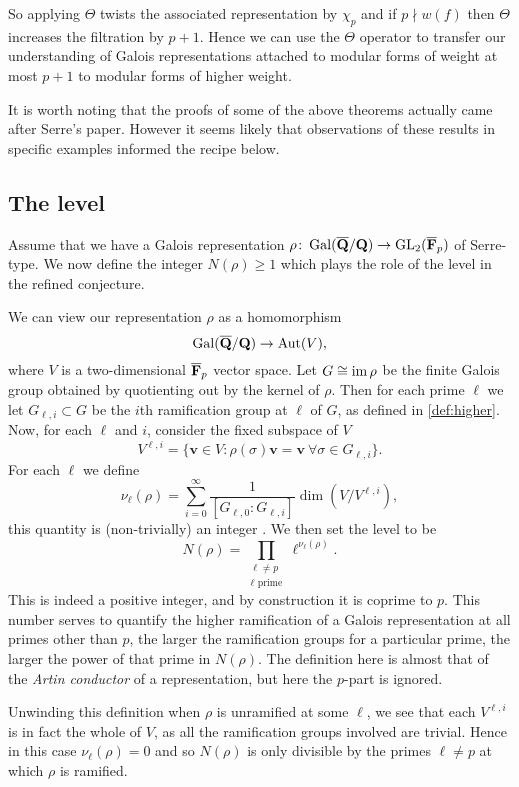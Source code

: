 \documentclass[a4paper,12pt]{article}
\begin{document}
So applying $\Theta$ twists the associated representation by $\chi_p$ and if $p\nmid w(f)$ then $\Theta$ increases the filtration by $p+1$.
Hence we can use the $\Theta$ operator to transfer our understanding of Galois representations attached to modular forms of weight at most $p+1$ to modular forms of higher weight.

It is worth noting that the proofs of some of the above theorems actually came after Serre's paper.
However it seems likely that observations of these results in specific examples informed the recipe below.


\subsection{The level}\label{subsec:level}
Assume that we have a Galois representation $\rho\colon \operatorname{Gal}(\overline{\mathbf{Q}}/\mathbf{Q}) \to \operatorname{GL}_2(\overline{\mathbf{F}}_p)$ of Serre-type.
We now define the integer $N(\rho) \ge 1$ which plays the role of the level in the refined conjecture.

We can view our representation $\rho$ as a homomorphism
\[
\operatorname{Gal}(\overline{\mathbf{Q}}/\mathbf{Q}) \to \operatorname{Aut}(V),
\]
where $V$ is a two-dimensional $\overline{\mathbf{F}}_p$ vector space.
Let $G\cong \operatorname{im} \rho$ be the finite Galois group obtained by quotienting out by the kernel of $\rho$.
Then for each prime $\ell$ we let $G_{\ell,i}\subset G$ be the $i$th ramification group at $\ell$ of $G$, as defined in \cref{def:higher}.
Now, for each $\ell$ and $i$, consider the fixed subspace of $V$
\[
V^{\ell,i} = \{\mathbf{v}\in V : \rho(\sigma) \mathbf{v} = \mathbf{v}\ \forall \sigma \in G_{\ell,i}\}.
\]
For each $\ell$ we define
\[
\nu_\ell(\rho) = \sum_{i = 0}^{\infty} \frac{1}{[G_{\ell,0} : G_{\ell,i}]} \dim(V/V^{\ell,i}),
\]
this quantity is (non-trivially) an integer \cite[p. 99]{SerreLF}.
We then set the level to be
\[
N(\rho) = \prod_{\substack{\ell \ne p\\ \ell\text{ prime}}} \ell^{\nu_\ell(\rho)}.
\]
This is indeed a positive integer, and by construction it is coprime to $p$.
This number serves to quantify the higher ramification of a Galois representation at all primes other than $p$, the larger the ramification groups for a particular prime, the larger the power of that prime in $N(\rho)$.
The definition here is almost that of the \emph{Artin conductor} of a representation, but here the $p$-part is ignored.

\begin{rmk}\label{rmk:unram}
Unwinding this definition when $\rho$ is unramified at some $\ell$, we see that each $V^{\ell,i}$ is in fact the whole of $V$, as all the ramification groups involved are trivial.
Hence in this case $\nu_\ell(\rho) = 0$ and so $N(\rho)$ is only divisible by the primes $\ell \ne p$ at which $\rho$ is ramified.
\end{rmk}
\end{document}
